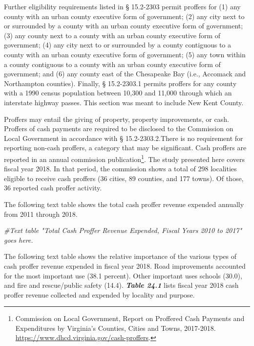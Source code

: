 \documentclass[
]{book}
\newenvironment{Shaded}{\begin{snugshade}}{\end{snugshade}}
\newcommand{\CommentTok}[1]{\textcolor[rgb]{0.56,0.35,0.01}{\textit{#1}}}
\begin{document}
Further eligibility requirements listed in § 15.2-2303 permit proffers for (1) any county with an urban county executive form of government; (2) any city next to or surrounded by a county with an urban county executive form of government; (3) any county next to a county with an urban county executive form of government; (4) any city next to or surrounded by a county contiguous to a county with an urban county executive form of government; (5) any town within a county contiguous to a county with an urban county executive form of government; and (6) any county east of the Chesapeake Bay (i.e., Accomack and Northampton counties). Finally, § 15.2-2303.1 permits proffers for any county with a 1990 census population between 10,300 and 11,000 through which an interstate highway passes. This section was meant to include New Kent County.

Proffers may entail the giving of property, property improvements, or cash. Proffers of cash payments are required to be disclosed to the Commission on Local Government in accordance with § 15.2-2303.2.There is no requirement for reporting non-cash proffers, a category that may be significant. Cash proffers are reported in an annual commission publication\footnote{Commission on Local Government, Report on Proffered Cash Payments and Expenditures by Virginia's Counties, Cities and Towns, 2017-2018. \url{https://www.dhcd.virginia.gov/cash-proffers}.}. The study presented here covers fiscal year 2018. In that period, the commission shows a total of 298 localities eligible to receive cash proffers (36 cities, 89 counties, and 177 towns). Of those, 36 reported cash proffer activity.

The following text table shows the total cash proffer revenue expended annually from 2011 through 2018.

\begin{Shaded}
\begin{Highlighting}[]
\CommentTok{\#Text table "Total Cash Proffer Revenue Expended, Fiscal Years 2010 to 2017" goes here.}
\end{Highlighting}
\end{Shaded}

The following text table shows the relative importance of the various types of cash proffer revenue expended in fiscal year 2018. Road improvements accounted for the most important use (38.1 percent). Other important uses schools (30.0), and fire and rescue/public safety (14.4). \textbf{\emph{Table 24.1}} lists fiscal year 2018 cash proffer revenue collected and expended by locality and purpose.
\end{document}
